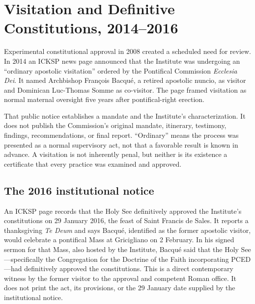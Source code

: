 \section{Visitation and Definitive Constitutions, 2014--2016}

Experimental constitutional approval in 2008 created a scheduled need for review. In 2014 an ICKSP news page announced that the Institute was undergoing an ``ordinary apostolic visitation'' ordered by the Pontifical Commission \emph{Ecclesia Dei}. It named Archbishop François Bacqué, a retired apostolic nuncio, as visitor and Dominican Luc-Thomas Somme as co-visitor. The page framed visitation as normal maternal oversight five years after pontifical-right erection.

That public notice establishes a mandate and the Institute's characterization. It does not publish the Commission's original mandate, itinerary, testimony, findings, recommendations, or final report. ``Ordinary'' means the process was presented as a normal supervisory act, not that a favorable result is known in advance. A visitation is not inherently penal, but neither is its existence a certificate that every practice was examined and approved.


\subsection{The 2016 institutional notice}

An ICKSP page records that the Holy See definitively approved the Institute's constitutions on 29 January 2016, the feast of Saint Francis de Sales. It reports a thanksgiving \emph{Te Deum} and says Bacqué, identified as the former apostolic visitor, would celebrate a pontifical Mass at Gricigliano on 2 February. In his signed sermon for that Mass, also hosted by the Institute, Bacqué said that the Holy See---specifically the Congregation for the Doctrine of the Faith incorporating PCED---had definitively approved the constitutions. This is a direct contemporary witness by the former visitor to the approval and competent Roman office. It does not print the act, its provisions, or the 29 January date supplied by the institutional notice.

